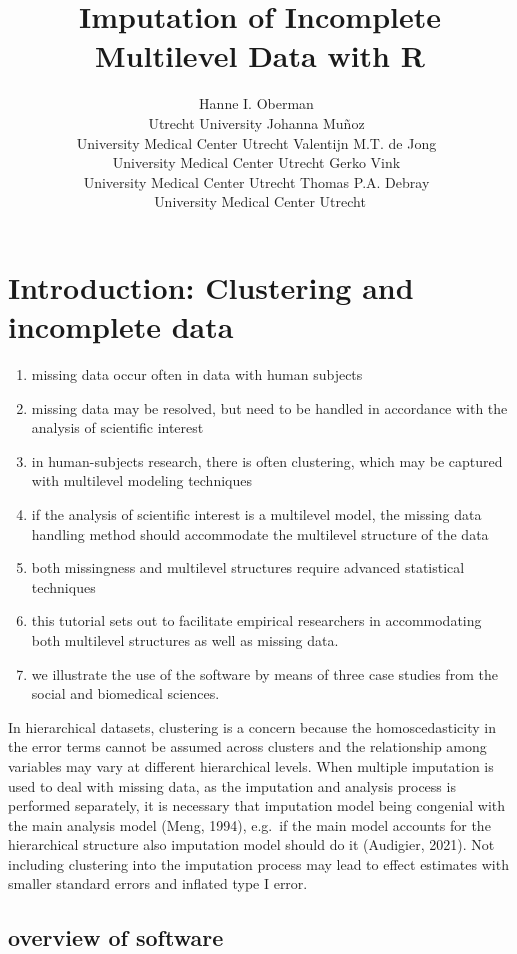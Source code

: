 \documentclass[
  article]{jss}
\author{Hanne I. Oberman~\orcidlink{0000-0003-3276-2141}\\Utrecht
University \And Johanna
Muñoz~\orcidlink{0000-0002-2384-5415}\\University Medical Center
Utrecht \AND Valentijn M.T. de
Jong~\orcidlink{0000-0001-9921-3468}\\University Medical Center
Utrecht \And Gerko Vink~\orcidlink{0000-0001-9767-1924}\\University
Medical Center Utrecht \AND Thomas P.A.
Debray~\orcidlink{0000-0002-1790-2719}\\University Medical Center
Utrecht}
\title{Imputation of Incomplete Multilevel Data with R}
\providecommand{\tightlist}{%
  \setlength{\itemsep}{0pt}\setlength{\parskip}{0pt}}\usepackage{longtable,booktabs,array}
\begin{document}
\maketitle
\hypertarget{sec-intro}{%
\section{Introduction: Clustering and incomplete data}\label{sec-intro}}

\begin{enumerate}
\def\labelenumi{\arabic{enumi}.}
\tightlist
\item
  missing data occur often in data with human subjects
\item
  missing data may be resolved, but need to be handled in accordance
  with the analysis of scientific interest
\item
  in human-subjects research, there is often clustering, which may be
  captured with multilevel modeling techniques
\item
  if the analysis of scientific interest is a multilevel model, the
  missing data handling method should accommodate the multilevel
  structure of the data
\item
  both missingness and multilevel structures require advanced
  statistical techniques
\item
  this tutorial sets out to facilitate empirical researchers in
  accommodating both multilevel structures as well as missing data.
\item
  we illustrate the use of the software by means of three case studies
  from the social and biomedical sciences.
\end{enumerate}

In hierarchical datasets, clustering is a concern because the
homoscedasticity in the error terms cannot be assumed across clusters
and the relationship among variables may vary at different hierarchical
levels. When multiple imputation is used to deal with missing data, as
the imputation and analysis process is performed separately, it is
necessary that imputation model being congenial with the main analysis
model (Meng, 1994), e.g.~if the main model accounts for the hierarchical
structure also imputation model should do it (Audigier, 2021). Not
including clustering into the imputation process may lead to effect
estimates with smaller standard errors and inflated type I error.

\hypertarget{overview-of-software}{%
\subsection{overview of software}\label{overview-of-software}}
\end{document}
